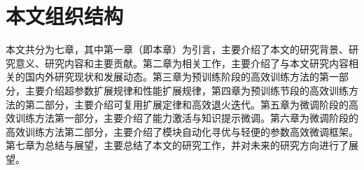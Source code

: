\section{本文组织结构}
本文共分为七章，其中第一章（即本章）为引言，主要介绍了本文的研究背景、研究意义、研究内容和主要贡献。第二章为相关工作，主要介绍了与本文研究内容相关的国内外研究现状和发展动态。第三章为预训练阶段的高效训练方法的第一部分，主要介绍超参数扩展规律和性能扩展规律，第四章为预训练节段的高效训练方法的第二部分，主要介绍可复用扩展定律和高效退火迭代。第五章为微调阶段的高效训练方法第一部分，主要介绍了能力激活与知识提示微调。第六章为微调阶段的高效训练方法第二部分，主要介绍了模块自动化寻优与轻便的参数高效微调框架。第七章为总结与展望，主要总结了本文的研究工作，并对未来的研究方向进行了展望。

